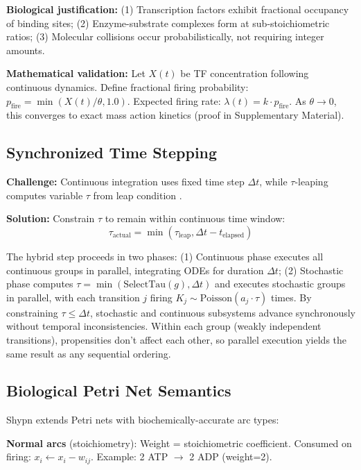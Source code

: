 \documentclass{bioinfo}
\begin{document}
\textbf{Biological justification:} (1) Transcription factors exhibit fractional occupancy of binding sites; (2) Enzyme-substrate complexes form at sub-stoichiometric ratios; (3) Molecular collisions occur probabilistically, not requiring integer amounts.

\textbf{Mathematical validation:} Let $X(t)$ be TF concentration following continuous dynamics. Define fractional firing probability: $p_{\text{fire}} = \min(X(t)/\theta, 1.0)$. Expected firing rate: $\lambda(t) = k \cdot p_{\text{fire}}$. As $\theta \to 0$, this converges to exact mass action kinetics (proof in Supplementary Material).

\subsection{Synchronized Time Stepping}

\textbf{Challenge:} Continuous integration uses fixed time step $\Delta t$, while $\tau$-leaping computes variable $\tau$ from leap condition \citep{cao2006efficient}.

\textbf{Solution:} Constrain $\tau$ to remain within continuous time window:
\begin{equation}
\tau_{\text{actual}} = \min(\tau_{\text{leap}}, \Delta t - t_{\text{elapsed}})
\end{equation}

The hybrid step proceeds in two phases: (1) Continuous phase executes all continuous groups in parallel, integrating ODEs for duration $\Delta t$; (2) Stochastic phase computes $\tau = \min(\text{SelectTau}(g), \Delta t)$ and executes stochastic groups in parallel, with each transition $j$ firing $K_j \sim \text{Poisson}(a_j \cdot \tau)$ times. By constraining $\tau \leq \Delta t$, stochastic and continuous subsystems advance synchronously without temporal inconsistencies. Within each group (weakly independent transitions), propensities don't affect each other, so parallel execution yields the same result as any sequential ordering.

\subsection{Biological Petri Net Semantics}

Shypn extends Petri nets with biochemically-accurate arc types:

\textbf{Normal arcs} (stoichiometry): Weight = stoichiometric coefficient. Consumed on firing: $x_i \gets x_i - w_{ij}$. Example: 2 ATP $\to$ 2 ADP (weight=2).
\end{document}

